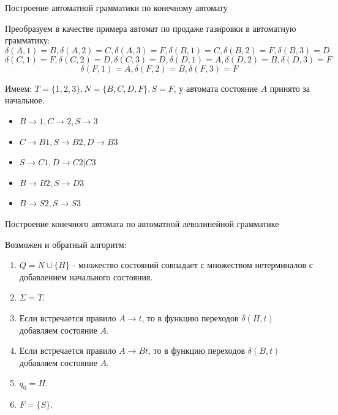 \documentclass[12pt, pdf, hyperref={unicode},handout]{beamer}
\begin{document}
\begin{frame}{Построение автоматной грамматики по конечному автомату}
  \begin{block}

    \small{
      Преобразуем в качестве примера автомат по продаже газировки в автоматную грамматику:
      $$\delta(A,1)=B, \delta(A,2)=C, \delta(A,3)=F, \delta(B,1)=C, \delta(B,2)=F, \delta(B,3)=D$$
      $$\delta(C,1)=F, \delta(C,2)=D, \delta(C,3)=D, \delta(D,1)=A, \delta(D,2)=B, \delta(D,3)=F$$
      $$\delta(F,1)=A, \delta(F,2)=B, \delta(F,3)=F$$

      Имеем: $T=\{1,2,3\}, N=\{B,C,D,F\}, S=F$, у автомата состояние $A$ принято за начальное.
      \begin{itemize}
      \item{$B\rightarrow 1, C\rightarrow 2, S\rightarrow 3$}
      \item{$C\rightarrow B1, S\rightarrow B2, D\rightarrow B3$}
      \item{$S\rightarrow C1, D\rightarrow C2|C3$}
      \item{$B\rightarrow B2, S\rightarrow D3$}
        \item{$B\rightarrow S2, S\rightarrow S3$}
        \end{itemize}
        }

  \end{block}
  
\end{frame}

\begin{frame}{Построение конечного автомата по автоматной леволинейной грамматике}
  \begin{block}

    \small{
      Возможен и обратный алгоритм:
      \begin{enumerate}
      \item{$Q=N\cup \{H\}$ - множество состояний совпадает с множеством нетерминалов с добавлением начального состояния.}
      \item{$\Sigma=T$.}
      \item{Если встречается правило $A\rightarrow t$, то в функцию переходов $\delta(H,t)$ добавляем состояние $A$.}
      \item{Если встречается правило $A\rightarrow Bt$, то в функцию переходов $\delta(B,t)$ добавляем состояние $A$.}
      \item{$q_0=H$.}
        \item{$F=\{S\}$.}
        
        \end{enumerate}
        }

  \end{block}
  
\end{frame}
\end{document}
